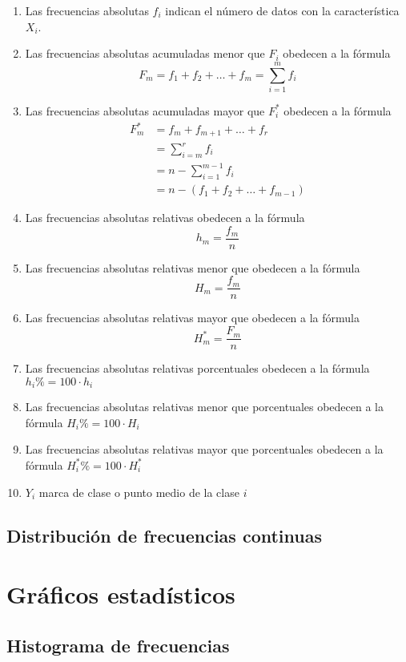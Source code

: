 \documentclass[a4paper]{report}
\begin{document}
\begin{enumerate}
	\item  Las frecuencias absolutas $f_i$ indican el número de datos con la característica $X_i$.
	\item   Las frecuencias absolutas acumuladas menor que $F_i$ obedecen a la fórmula $$F_m=f_1+f_2+\ldots+f_m=\sum_{i=1}^mf_i$$
	\item   Las frecuencias absolutas acumuladas mayor que $F_i^*$ obedecen a la fórmula
		$$
		\begin{aligned}
			F_m^*&=f_m+f_{m+1}+\ldots+f_r\\
			&=\sum_{i=m}^rf_i\\
			&=n-\sum_{i=1}^{m-1}f_i\\
			&=n-\left(f_1+f_{2}+\ldots+f_{m-1}\right)
		\end{aligned}
		$$
	\item   Las frecuencias absolutas relativas obedecen a la fórmula $$h_m=\frac{f_m}{n}$$
	\item   Las frecuencias absolutas relativas menor que obedecen a la fórmula $$H_m=\frac{f_m}{n}$$
	\item   Las frecuencias absolutas relativas mayor que obedecen a la fórmula $$H_m^*=\frac{F_m}{n}$$
	\item   Las frecuencias absolutas relativas porcentuales obedecen a la fórmula $h_i\%=100\cdot h_i$
	\item  Las frecuencias absolutas relativas menor que porcentuales obedecen a la fórmula $H_i\%=100\cdot H_i$
	\item   Las frecuencias absolutas relativas mayor que porcentuales obedecen a la fórmula $H_i^*\%=100\cdot H_i^*$
	\item  $Y_i$ marca de clase o punto medio de la clase $i$
\end{enumerate}


\subsection{Distribución de frecuencias continuas}


\section{Gráficos estadísticos}

\subsection{Histograma de frecuencias}
\end{document}
